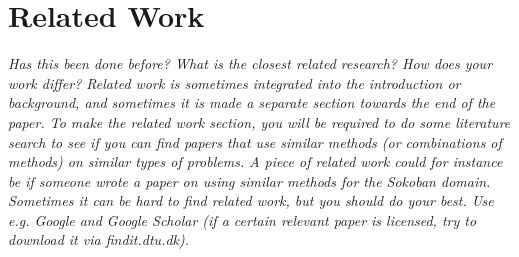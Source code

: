 \section{Related Work}
\label{sec:related work}

\emph{Has this been done before? What is the closest related research? How does your work differ? Related work is sometimes integrated into the introduction or background, and sometimes it is made a separate section towards the end of the paper.  To make the related work section, you will be required to do some literature search to see if you can find papers that use similar methods (or combinations of methods) on similar types of problems. A piece of related work could for instance be if someone wrote a paper on using similar methods for the Sokoban domain. Sometimes it can be hard to find related work, but you should do your best. Use e.g. Google and Google Scholar (if a certain relevant paper is licensed, try to download it via findit.dtu.dk).}

